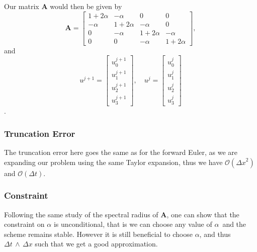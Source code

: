 \documentclass[%
reprint,
nofootinbib,
amsmath,amssymb,
aps,
]{revtex4-1}
\newcommand{\dt}{{\Delta t}}
\newcommand{\dx}{{\Delta x}}
\begin{document}
Our matrix $\mathbf{A}$ would then be given by 
\begin{equation}\label{mat BE}
	\mathbf{A} =	\begin{bmatrix}
		1+2\alpha & -\alpha & 0 & 0 \\
		-\alpha & 1+2\alpha & -\alpha & 0 \\
		0 &	-\alpha & 1+2\alpha & -\alpha \\
		0 & 0 &	-\alpha & 1+2\alpha
	\end{bmatrix},
\end{equation}
and 
\begin{equation}
	u^{j+1} = \begin{bmatrix}
		u^{j+1}_0\\		u^{j+1}_1 \\ u^{j+1}_2 \\u^{j+1}_3
	\end{bmatrix}, \quad 
	u^{j} = \begin{bmatrix}
		u^{j}_0\\		u^{j}_1 \\ u^{j}_2 \\u^{j}_3
	\end{bmatrix}
\end{equation}.
\subsubsection{Truncation Error}
The truncation error here goes the same as for the forward Euler, as we are expanding our problem using the same Taylor expansion, thus we have $\mathcal{O}(\dx^2)$ and $\mathcal{O}(\dt)$.
\subsubsection{Constraint}
Following the same study of the spectral radius of $\mathbf{A}$, one can show that the constraint on $\alpha$ is unconditional, that is we can choose any value of $\alpha$ and the scheme remains stable\cite{bookA}. However it is still beneficial to choose $\alpha$, and thus $\dt\,\land\,\dx$ such that we get a good approximation.
\end{document}
